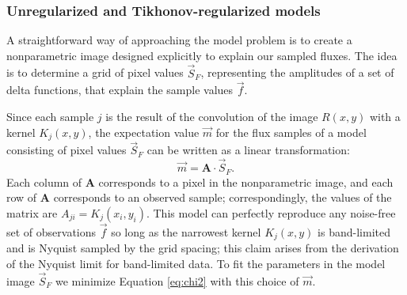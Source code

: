 \documentclass[twocolumn,tighten]{aastex61}
\begin{document}
\subsubsection{Unregularized and Tikhonov-regularized models}
\label{subsec:linear}

A straightforward way of approaching the model problem is to create a
nonparametric image designed explicitly to explain our sampled
fluxes. The idea is to determine a grid of pixel values $\vec{S}_F$,
representing the amplitudes of a set of delta functions, that explain
the sample values $\vec{f}$. 

Since each sample $j$ is the result of the convolution of the image
$R(x, y)$ with a kernel $K_j(x, y)$, the expectation value $\vec{m}$
for the flux samples of a model consisting of pixel values $\vec{S}_F$
can be written as a linear transformation:
\begin{equation}
\vec{m} = \mathbf{A}\cdot \vec{S}_F.
\end{equation}
Each column of $\mathbf{A}$ corresponds to a pixel in the
nonparametric image, and each row of $\mathbf{A}$ corresponds to an
observed sample; correspondingly, the values of the matrix are $A_{ji}
= K_j(x_i, y_i)$.  This model can perfectly reproduce any noise-free
set of observations $\vec{f}$ so long as the narrowest kernel
$K_j(x,y)$ is band-limited and is Nyquist sampled by the grid spacing;
this claim arises from the derivation of the Nyquist limit for
band-limited data.  To fit the parameters in the model image
$\vec{S}_F$ we minimize Equation \ref{eq:chi2} with this choice of
$\vec{m}$.
\end{document}
